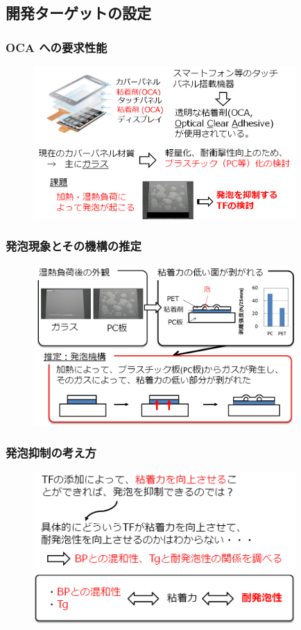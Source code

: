 \documentclass[unicode,12pt]{beamer}%
\begin{document}
\subsection{開発ターゲットの設定}
\begin{frame}
	\frametitle{OCA への要求性能}
	\begin{figure}
		\begin{center}
			\includegraphics[width=100mm]{target.png}
		\end{center}
	\end{figure}
\end{frame}


%
\begin{frame}\frametitle{発泡現象とその機構の推定}
	\begin{figure}
		\begin{center}
			\includegraphics[width=100mm]{PC_delami.png}
		\end{center}
	\end{figure}
\end{frame}

\begin{frame}\frametitle{発泡抑制の考え方}
	\begin{figure}
		\begin{center}
			\includegraphics[width=100mm]{aproach.png}
		\end{center}
	\end{figure}
\end{frame}
\end{document}
